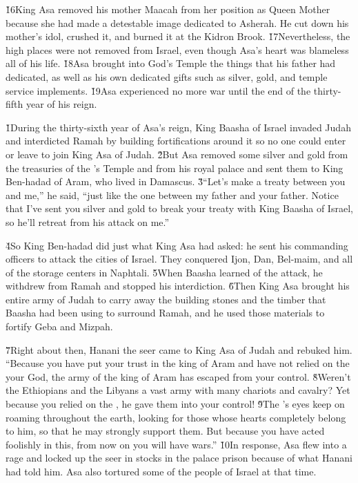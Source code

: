 \v{16}King Asa removed his mother Maacah from her position as Queen Mother because she had made a detestable image dedicated to Asherah. He cut down his mother's idol, crushed it, and burned it at the Kidron Brook. \v{17}Nevertheless, the high places were not removed from Israel, even though Asa's heart was blameless all of his life. \v{18}Asa brought into God's Temple the things that his father had dedicated, as well as his own dedicated gifts such as silver, gold, and temple service implements. \v{19}Asa experienced no more war until the end of the thirty-fifth year of his reign.

\v{1}During the thirty-sixth year of Asa's reign, King Baasha of Israel invaded Judah and interdicted Ramah by building fortifications around it so no one could enter or leave to join King Asa of Judah. \v{2}But Asa removed some silver and gold from the treasuries of the 's Temple and from his royal palace and sent them to King Ben-hadad of Aram, who lived in Damascus. \v{3}``Let's make a treaty between you and me,'' he said, ``just like the one between my father and your father. Notice that I've sent you silver and gold to break your treaty with King Baasha of Israel, so he'll retreat from his attack on me.''

\v{4}So King Ben-hadad did just what King Asa had asked: he sent his commanding officers to attack the cities of Israel. They conquered Ijon, Dan, Bel-maim, and all of the storage centers in Naphtali. \v{5}When Baasha learned of the attack, he withdrew from Ramah and stopped his interdiction. \v{6}Then King Asa brought his entire army of Judah to carry away the building stones and the timber that Baasha had been using to surround Ramah, and he used those materials to fortify Geba and Mizpah.

\v{7}Right about then, Hanani the seer came to King Asa of Judah and rebuked him. ``Because you have put your trust in the king of Aram and have not relied on the  your God, the army of the king of Aram has escaped from your control. \v{8}Weren't the Ethiopians and the Libyans a vast army with many chariots and cavalry? Yet because you relied on the , he gave them into your control! \v{9}The 's eyes keep on roaming throughout the earth, looking for those whose hearts completely belong to him, so that he may strongly support them. But because you have acted foolishly in this, from now on you will have wars.'' \v{10}In response, Asa flew into a rage and locked up the seer in stocks in the palace prison because of what Hanani had told him. Asa also tortured some of the people of Israel at that time.

